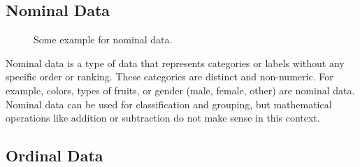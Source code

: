 \documentclass[
  a4paper,
]{scrbook}
\begin{document}
\subsection{Nominal Data}\label{nominal-data}

\begin{figure}[ht]


\caption{\label{fig-nomialdata}Some example for nominal data.}

\end{figure}%

Nominal data is a type of data that represents categories or labels
without any specific order or ranking. These categories are distinct and
non-numeric. For example, colors, types of fruits, or gender (male,
female, other) are nominal data. Nominal data can be used for
classification and grouping, but mathematical operations like addition
or subtraction do not make sense in this context.

\subsection{Ordinal Data}\label{ordinal-data}
\end{document}
